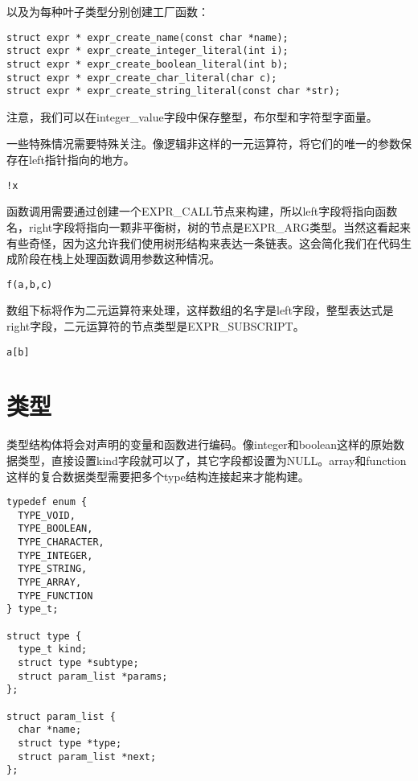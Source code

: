 \documentclass[cn,11pt,chinese]{elegantbook}
\begin{document}
以及为每种叶子类型分别创建工厂函数：

\begin{verbatim}
struct expr * expr_create_name(const char *name);
struct expr * expr_create_integer_literal(int i);
struct expr * expr_create_boolean_literal(int b);
struct expr * expr_create_char_literal(char c);
struct expr * expr_create_string_literal(const char *str);
\end{verbatim}

注意，我们可以在integer\_value字段中保存整型，布尔型和字符型字面量。

一些特殊情况需要特殊关注。像逻辑非这样的一元运算符，将它们的唯一的参数保存在left指针指向的地方。

\begin{verbatim}
!x
\end{verbatim}

函数调用需要通过创建一个EXPR\_CALL节点来构建，所以left字段将指向函数名，right字段将指向一颗非平衡树，树的节点是EXPR\_ARG类型。当然这看起来有些奇怪，因为这允许我们使用树形结构来表达一条链表。这会简化我们在代码生成阶段在栈上处理函数调用参数这种情况。

\begin{verbatim}
f(a,b,c)
\end{verbatim}

数组下标将作为二元运算符来处理，这样数组的名字是left字段，整型表达式是right字段，二元运算符的节点类型是EXPR\_SUBSCRIPT。

\begin{verbatim}
a[b]
\end{verbatim}

\section{类型}

类型结构体将会对声明的变量和函数进行编码。像integer和boolean这样的原始数据类型，直接设置kind字段就可以了，其它字段都设置为NULL。array和function这样的复合数据类型需要把多个type结构连接起来才能构建。

\begin{verbatim}
typedef enum {
  TYPE_VOID,
  TYPE_BOOLEAN,
  TYPE_CHARACTER,
  TYPE_INTEGER,
  TYPE_STRING,
  TYPE_ARRAY,
  TYPE_FUNCTION
} type_t;

struct type {
  type_t kind;
  struct type *subtype;
  struct param_list *params;
};

struct param_list {
  char *name;
  struct type *type;
  struct param_list *next;
};
\end{verbatim}
\end{document}
